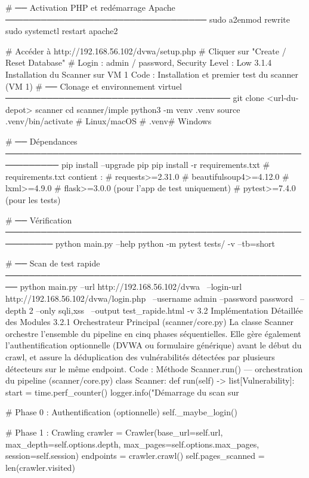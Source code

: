 # ── Activation PHP et redémarrage Apache ──────────────────────────────────
sudo a2enmod rewrite
sudo systemctl restart apache2

# Accéder à http://192.168.56.102/dvwa/setup.php
# Cliquer sur "Create / Reset Database"
# Login : admin / password, Security Level : Low
3.1.4  Installation du Scanner sur VM 1
Code : Installation et premier test du scanner (VM 1)
# ── Clonage et environnement virtuel ──────────────────────────────────────
git clone <url-du-depot> scanner
cd scanner/imple
python3 -m venv .venv
source .venv/bin/activate      # Linux/macOS
# .venv\Scripts\activate       # Windows

# ── Dépendances ───────────────────────────────────────────────────────────
pip install --upgrade pip
pip install -r requirements.txt
# requirements.txt contient :
# requests>=2.31.0
# beautifulsoup4>=4.12.0
# lxml>=4.9.0
# flask>=3.0.0      (pour l'app de test uniquement)
# pytest>=7.4.0     (pour les tests)

# ── Vérification ──────────────────────────────────────────────────────────
python main.py --help
python -m pytest tests/ -v --tb=short

# ── Scan de test rapide ────────────────────────────────────────────────────
python main.py --url http://192.168.56.102/dvwa \
               --login-url http://192.168.56.102/dvwa/login.php \
               --username admin --password password \
               --depth 2 --only sqli,xss \
               --output test_rapide.html -v
3.2  Implémentation Détaillée des Modules
3.2.1  Orchestrateur Principal (scanner/core.py)
La classe Scanner orchestre l'ensemble du pipeline en cinq phases séquentielles. Elle gère également l'authentification optionnelle (DVWA ou formulaire générique) avant le début du crawl, et assure la déduplication des vulnérabilités détectées par plusieurs détecteurs sur le même endpoint.
Code : Méthode Scanner.run() — orchestration du pipeline (scanner/core.py)
class Scanner:
    def run(self) -> list[Vulnerability]:
        start = time.perf_counter()
        logger.info("Démarrage du scan sur %

        # Phase 0 : Authentification (optionnelle)
        self._maybe_login()

        # Phase 1 : Crawling
        crawler = Crawler(base_url=self.url, max_depth=self.options.depth,
                          max_pages=self.options.max_pages, session=self.session)
        endpoints = crawler.crawl()
        self.pages_scanned = len(crawler.visited)

